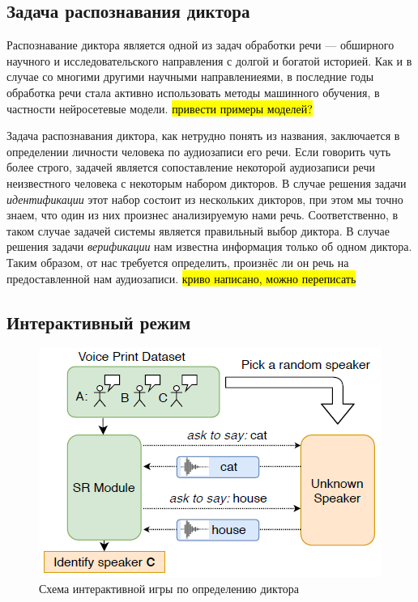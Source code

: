 \subsection{Задача распознавания диктора}

Распознавание диктора является одной из задач обработки речи --- обширного
научного и исследовательского направления с долгой и богатой историей. Как и в
случае со многими другими научными направлениеями, в последние годы обработка
речи стала активно использовать методы машинного обучения, в частности
нейросетевые модели. \hl{привести примеры моделей?}

Задача распознавания диктора, как нетрудно понять из названия, заключается в
определении личности человека по аудиозаписи его речи. Если говорить чуть
более строго, задачей является сопоставление некоторой аудиозаписи речи
неизвестного человека с некоторым набором дикторов. В случае решения задачи
\emph{идентификации} этот набор состоит из нескольких дикторов, при этом мы
точно знаем, что один из них произнес анализируемую нами речь. Соответственно,
в таком случае задачей системы является правильный выбор диктора. В случае
решения задачи \emph{верификации} нам известна информация только об одном
диктора. Таким образом, от нас требуется определить, произнёс ли он речь на
предоставленной нам аудиозаписи. \hl{криво написано, можно переписать}

\subsection{Интерактивный режим}\label{ssec:isr}

\begin{figure}[htb]
    \centering
    \includegraphics[scale=0.8]{../presentation/figures/isr_game.png}
    \caption{Схема интерактивной игры по определению диктора \citeisr}
\end{figure}